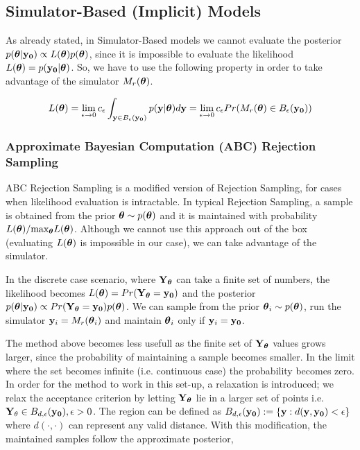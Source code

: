 \subsection{Simulator-Based (Implicit) Models}

As already stated, in Simulator-Based models we cannot evaluate the
posterior $p(\boldsymbol{\theta}|\mathbf{y_0}) \propto L(\boldsymbol{\theta})p(\boldsymbol{\theta})$, since it is
impossible to evaluate the likelihood $L(\boldsymbol{\theta}) =
p(\mathbf{y_0}|\boldsymbol{\theta})$. So, we have to use the following property in order
to take advantage of the simulator $M_r(\boldsymbol{\theta})$.

\begin{equation} \label{eq:likelihood} L(\boldsymbol{\theta}) = \lim_{\epsilon \to
    0} c_\epsilon \int_{\mathbf{y} \in B_\epsilon(\mathbf{y_0})} p(\mathbf{y}|\boldsymbol{\theta})d\mathbf{y}
  = \lim_{\epsilon \to 0} c_\epsilon Pr(M_r(\boldsymbol{\theta}) \in
  B_\epsilon(\mathbf{y_0}))
\end{equation}

\subsubsection{Approximate Bayesian Computation (ABC) Rejection
  Sampling}

ABC Rejection Sampling is a modified version of Rejection Sampling,
for cases when likelihood evaluation is intractable. In typical
Rejection Sampling, a sample is obtained from the prior
$\boldsymbol{\theta} \sim p(\boldsymbol{\theta})$ and it is maintained with probability
$L(\boldsymbol{\theta})/ \text{max}_{\boldsymbol{\theta}} L(\boldsymbol{\theta})$. Although we cannot use
this approach out of the box (evaluating $L(\boldsymbol{\theta})$ is impossible in
our case), we can take advantage of the simulator.

In the discrete case scenario, where $\mathbf{Y}_{\boldsymbol{\theta}}$ can take a finite
set of numbers, the likelihood becomes
$L(\boldsymbol{\theta}) = Pr(\mathbf{Y}_{\boldsymbol{\theta}} = \mathbf{y_0})$ and the posterior
$p(\boldsymbol{\theta}|\mathbf{y_0}) \propto Pr(\mathbf{Y}_{\boldsymbol{\theta}}=\mathbf{y_0})p(\boldsymbol{\theta})$. We can
sample from the prior $\boldsymbol{\theta}_i \sim p(\boldsymbol{\theta})$, run the simulator
$\mathbf{y}_i = M_r(\boldsymbol{\theta}_i)$ and maintain $\boldsymbol{\theta}_i$ only if
$\mathbf{y}_i = \mathbf{y_0}$.

The method above becomes less usefull as the finite set of
$\mathbf{Y}_{\boldsymbol{\theta}}$ values grows larger, since the probability of
maintaining a sample becomes smaller. In the limit where the set
becomes infinite (i.e. continuous case) the probability becomes
zero. In order for the method to work in this set-up, a relaxation is
introduced; we relax the acceptance criterion by letting
$\mathbf{Y}_{\boldsymbol{\theta}}$ lie in a larger set of points i.e.
$\mathbf{Y}_{\theta} \in B_{d,\epsilon}(\mathbf{y_0}), \epsilon > 0$. The region can be
defined as $B_{d,\epsilon} (\mathbf{y_0}) := \{\mathbf{y}: d(\mathbf{y}, \mathbf{y_0}) < \epsilon \}$
where $d(\cdot, \cdot)$ can represent any valid distance. With this
modification, the maintained samples follow the approximate posterior,

